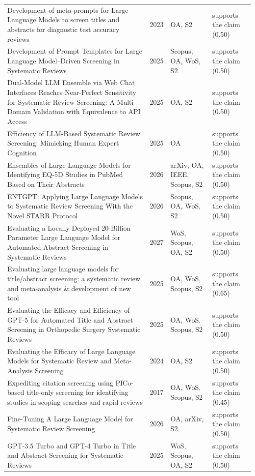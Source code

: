 \begin{longtable}{@{}%
  >{\raggedright\arraybackslash}p{}c%
  >{\raggedright\arraybackslash}p{}%
  >{\raggedright\arraybackslash}p{}@{}}
Development of meta-prompts for Large Language Models to screen titles and abstracts for diagnostic test accuracy reviews & 2023 & OA, S2 & supports the claim (0.50) \\
Development of Prompt Templates for Large Language Model--Driven Screening in Systematic Reviews & 2025 & Scopus, OA, WoS, S2 & supports the claim (0.50) \\
Dual-Model LLM Ensemble via Web Chat Interfaces Reaches Near-Perfect Sensitivity for Systematic-Review Screening: A Multi-Domain Validation with Equivalence to API Access & 2025 & OA, S2 & supports the claim (0.50) \\
Efficiency of LLM-Based Systematic Review Screening: Mimicking Human Expert Cognition & 2025 & OA & supports the claim (0.50) \\
Ensembles of Large Language Models for Identifying EQ-5D Studies in PubMed Based on Their Abstracts & 2026 & arXiv, OA, IEEE, Scopus, S2 & supports the claim (0.50) \\
ENTGPT: Applying Large Language Models to Systematic Review Screening With the Novel STARR Protocol & 2026 & Scopus, OA, WoS, S2 & supports the claim (0.50) \\
Evaluating a Locally Deployed 20-Billion Parameter Large Language Model for Automated Abstract Screening in Systematic Reviews & 2027 & WoS, Scopus, OA, S2 & supports the claim (0.50) \\
Evaluating large language models for title/abstract screening: a systematic review and meta-analysis \& development of new tool & 2025 & OA, WoS, Scopus, S2 & supports the claim (0.65) \\
Evaluating the Efficacy and Efficiency of GPT-5 for Automated Title and Abstract Screening in Orthopedic Surgery Systematic Reviews & 2025 & OA, WoS, Scopus, S2 & supports the claim (0.50) \\
Evaluating the Efficacy of Large Language Models for Systematic Review and Meta-Analysis Screening & 2024 & OA, S2 & supports the claim (0.50) \\
Expediting citation screening using PICo-based title-only screening for identifying studies in scoping searches and rapid reviews & 2017 & OA, WoS, Scopus, S2 & supports the claim (0.45) \\
Fine-Tuning A Large Language Model for Systematic Review Screening & 2026 & OA, arXiv, S2 & supports the claim (0.50) \\
GPT-3.5 Turbo and GPT-4 Turbo in Title and Abstract Screening for Systematic Reviews & 2025 & WoS, Scopus, OA, S2 & supports the claim (0.50) \\

\end{longtable}
